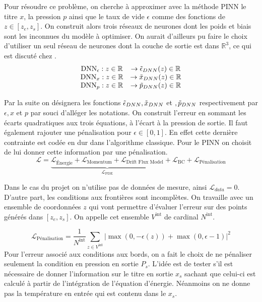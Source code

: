 Pour résoudre ce problème, on cherche à approximer avec la méthode PINN le titre $x$, la pression $p$ ainsi que le taux de vide $\epsilon$ comme des fonctions de $z \in [z_e,z_s]$. On construit alors trois réseaux de neurones dont les poids et biais sont les inconnues du modèle à optimiser. On aurait d'ailleurs pu faire le choix d'utiliser un seul réseau de neurones dont la couche de sortie est dans $\mathbb{R}^3$, ce qui est discuté chez \cite{haghighatDeepLearningFramework2020}.\\
\begin{equation}
    \begin{array}{cc}
        \text{DNN}_{\epsilon} : z \in \mathbb{R} & \rightarrow \Tilde{\epsilon}_{DNN}(z) \in \mathbb{R}  \\
        \text{DNN}_{x} : z \in \mathbb{R} & \rightarrow \Tilde{x}_{DNN}(z) \in \mathbb{R}  \\
        \text{DNN}_{p} : z \in \mathbb{R} & \rightarrow \Tilde{p}_{DNN}(z) \in \mathbb{R} 
    \end{array}
\end{equation}

Par la suite on désignera les fonctions $\Tilde{\epsilon}_{DNN} , \Tilde{x}_{DNN}$ et $, \Tilde{p}_{DNN}$ respectivement par $\epsilon,x$ et $p$ par souci d'alléger les notations. On construit l'erreur en sommant les écarts quadratiques aux trois équations, à l'écart à la pression de sortie. Il faut également rajouter une pénalisation pour $\epsilon \in [0,1]$. En effet cette dernière contrainte est codée en dur dans l'algorithme classique. Pour le PINN on choisit de lui donner cette information par une pénalisation.\\

\begin{equation}
    \mathcal{L} = \underbrace{\mathcal{L}_{\text{Énergie}} + \mathcal{L}_{\text{Momentum}} + \mathcal{L}_{\text{Drift Flux Model}}}_{\mathcal{L}_{\text{PDE}}} + \mathcal{L}_{\text{BC}} + \mathcal{L}_{\text{Pénalisation}}
\end{equation}

Dans le cas du projet on n'utilise pas de données de mesure, ainsi $\mathcal{L}_{data} = 0$. D'autre part, les conditions aux frontières sont incomplètes. On travaille avec un ensemble de coordonnées $z$ qui vont permettre d'évaluer l'erreur sur des points générés dans $[z_e,z_s]$. On appelle cet ensemble $V^{\text{int}}$ de cardinal $N^{\text{int}}$.

\begin{equation}
    \mathcal{L}_{\text{Pénalisation}} = \frac{1}{N^{\text{int}}}\sum_{z\in V^{\text{int}}} \left| \max(0,-\epsilon(z)) + \max(0,\epsilon-1) \right|^2
\end{equation}
Pour l'erreur associé aux conditions aux bords, on a fait le choix de ne pénaliser seulement la condition en pression en sortie $P_s$. L'idée est de tester s'il est nécessaire de donner l'information sur le titre en sortie $x_s$ sachant que celui-ci est calculé à partir de l'intégration de l'équation d'énergie. Néanmoins on ne donne pas la température en entrée qui est contenu dans le $x_s$.

